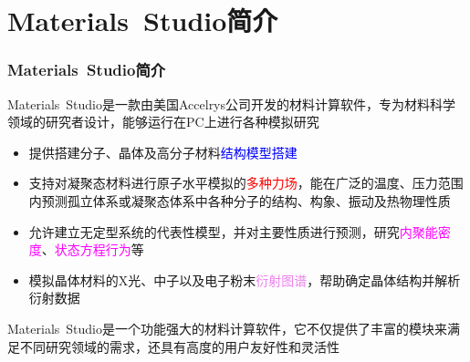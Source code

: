 \appendix
\section{\rm{Materials~Studio}简介}
\frame
{
	\frametitle{\textrm{Materials~Studio}简介}
	\textrm{Materials~Studio}是一款由美国\textrm{Accelrys}公司开发的材料计算软件，专为材料科学领域的研究者设计，能够运行在\textrm{PC}上进行各种模拟研究
	\begin{itemize}
		\item %
			提供搭建分子、晶体及高分子材料\textcolor{blue}{结构模型搭建} %
		\item %
			支持对凝聚态材料进行原子水平模拟的\textcolor{red}{多种力场}，能在广泛的温度、压力范围内预测孤立体系或凝聚态体系中各种分子的结构、构象、振动及热物理性质
		\item %
			允许建立无定型系统的代表性模型，并对主要性质进行预测，研究\textcolor{magenta}{内聚能密度}、\textcolor{magenta}{状态方程行为}等
		\item %
			模拟晶体材料的\textrm{X}光、中子以及电子粉末\textcolor{violet}{衍射图谱}，帮助确定晶体结构并解析衍射数据

%
	\end{itemize}
%





	\textrm{Materials~Studio}是一个功能强大的材料计算软件，它不仅提供了丰富的模块来满足不同研究领域的需求，还具有高度的用户友好性和灵活性%
}

